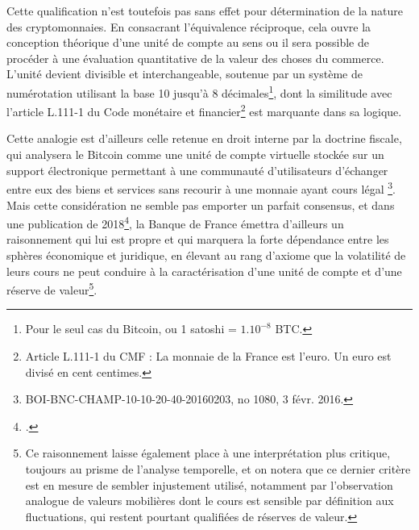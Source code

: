 {Cette qualification n'est toutefois pas sans effet pour détermination de la nature des cryptomonnaies. En consacrant l'équivalence réciproque, cela ouvre la conception théorique d'une unité de compte au sens ou il sera possible de procéder à une évaluation quantitative de la valeur des choses du commerce. L'unité devient divisible et interchangeable, soutenue par un système de numérotation utilisant la base 10 jusqu'à 8 décimales\footnote{Pour le seul cas du Bitcoin, ou 1 satoshi = \(1.10^{-8}\) BTC.}, dont la similitude avec l'article L.111-1 du Code monétaire et financier\footnote{Article L.111-1 du CMF : \og La monnaie de la France est l'euro. Un euro est divisé en cent centimes\fg{}.} est marquante dans sa logique.\par 

Cette analogie est d'ailleurs celle retenue en droit interne par la doctrine fiscale, qui analysera le Bitcoin comme \og une unité de compte virtuelle stockée sur un support électronique permettant à une communauté d'utilisateurs d'échanger entre eux des biens et services sans recourir à une monnaie ayant cours légal \fg{}\footnote{BOI-BNC-CHAMP-10-10-20-40-20160203, no 1080, 3 févr. 2016.}. Mais cette considération ne semble pas emporter un parfait consensus, et dans une publication de 2018\footnote{.}, la Banque de France émettra d'ailleurs un raisonnement qui lui est propre et qui marquera la forte dépendance entre les sphères économique et juridique, en élevant au rang d'axiome que la volatilité de leurs cours ne peut conduire à la caractérisation d'une unité de compte et d'une réserve de valeur\footnote{Ce raisonnement laisse également place à une interprétation plus critique, toujours au prisme de l'analyse temporelle, et on notera que ce dernier critère est en mesure de sembler injustement utilisé, notamment par l'observation analogue de valeurs mobilières dont le cours est sensible par définition aux fluctuations, qui restent pourtant qualifiées de réserves de valeur.}.\par

}
